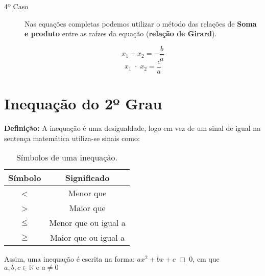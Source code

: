 \begin{description}
		\item[4º Caso] Nas equações completas podemos utilizar o método das relações de \textbf{Soma e produto} entre as raízes da equação (\textbf{relação de Girard}).
		
		\[
		x_1 + x_2 = - \dfrac{b}{a}
		\]
		\[
		x_1\; \cdot \; x_2 = \dfrac{c}{a}
		\]

        \begin{texample}
        \centering
        \end{texample}
	\end{description}
	
	\section{Inequação do 2º Grau}
 
	\noindent
	\textbf{Definição:}	A inequação é uma desigualdade, logo em vez de um sinal de igual na sentença matemática utiliza-se sinais como:\\
	
	\begin{table}[htbp]
		\centering
		\caption{Símbolos de uma inequação.}
		\begin{tabular}{cc}
			\hline
			Símbolo &  Significado \bigstrut\\
			\hline
			<  & Menor que \bigstrut\\
			> & Maior que \bigstrut\\
			$\le$ &  Menor que ou igual a \bigstrut\\
			$\ge$ &  Maior que ou igual a \\
            \hline
		\end{tabular}%
		\label{tab:addlabel}%
	\end{table}%
	Assim, uma inequação é escrita na forma: $ax^2 + bx + c \; \Box \; 0$, em que $a, b, c \in \mathbb{R} \text{ e } a \neq 0$\\
 
